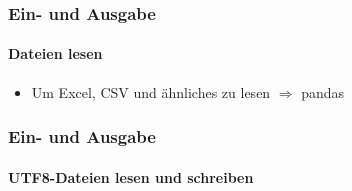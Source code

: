 \documentclass[12pt,ngerman]{beamer}
\begin{document}
\begin{frame}[fragile]
\frametitle{Ein- und Ausgabe}
\framesubtitle{Dateien lesen}

 

\begin{itemize}
	\item Um Excel, CSV und ähnliches zu lesen $\Rightarrow$ pandas
\end{itemize}
\end{frame}


\begin{frame}[fragile]
\frametitle{Ein- und Ausgabe}
\framesubtitle{UTF8-Dateien lesen und schreiben}

 

\end{frame}
\end{document}
